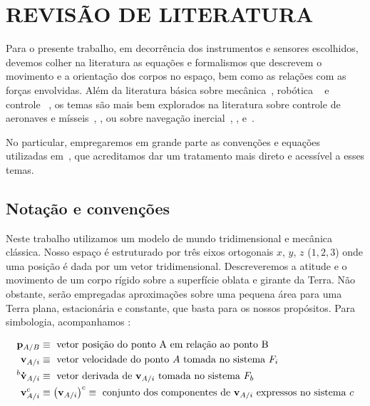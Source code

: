 \chapter{REVISÃO DE LITERATURA}\label{chap:fundamentacaoTeorica}

Para o presente trabalho, em decorrência dos instrumentos e sensores escolhidos, devemos colher na literatura as equações e formalismos que descrevem o movimento e a orientação dos corpos no espaço, bem como as relações com as forças envolvidas. Além da literatura básica sobre mecânica~\cite{Goldstein1980}, robótica ~\cite{Craig2014} e controle ~\cite{Ogata2010}, os temas são mais bem explorados na literatura sobre controle de aeronaves e mísseis~\cite{Henderson1997}, \cite{Stevens2016}, \cite{Blakelock1991} ou sobre navegação inercial~\cite{Stovall1997}, \cite{Weston2004}, \cite{Wang2021} e~\cite{Haoran2019}.

No particular, empregaremos em grande parte as convenções e equações utilizadas em~\cite{Stevens2016}, que acreditamos dar um tratamento mais direto e acessível a esses temas.

\section{Notação e convenções}

Neste trabalho utilizamos um modelo de mundo tridimensional e mecânica clássica.  Nosso espaço é estruturado por três eixos ortogonais \(x\), \(y\), \(z\) (\(1, 2, 3\)) onde uma posição é dada por um vetor tridimensional. Descreveremos a atitude e o movimento de um corpo rígido sobre a superfície oblata e girante da Terra. Não obstante, serão empregadas aproximações sobre uma pequena área para uma Terra plana, estacionária e constante, que basta\footnotemark{} para os nossos propósitos. Para simbologia, acompanhamos \cite{Stevens2016}:

\begin{align*}
    \mathbf{p}_{A/B} &\equiv
    \text{ vetor posição do ponto A em relação ao ponto B} \\
    \mathbf{v}_{A/i} &\equiv
    \text{ vetor velocidade do ponto \(A\) tomada no sistema \(F_{i}\)} \\
    ^{b}\mathbf{\dot{v}}_{A/i} &\equiv
    \text{ vetor derivada de \(\mathbf{v}_{A/i}\) tomada no sistema \( F_{b}\)} \\
    \mathbf{v}^{c}_{A/i} &\equiv \left( \mathbf{v}_{A/i} \right)^{c} \equiv
    \text{ conjunto dos componentes de \(\mathbf{v}_{A/i}\) expressos no sistema \(c\)} \\
\end{align*}

